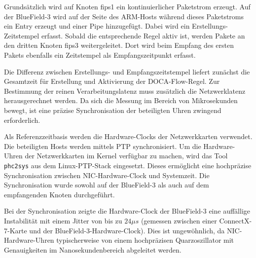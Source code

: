\documentclass[paper=a4, fontsize=11pt]{scrartcl} %
\numberwithin{equation}{section} %
\numberwithin{figure}{section} %
\numberwithin{table}{section} %
\begin{document}
Grundsätzlich wird auf Knoten fips1 ein kontinuierlicher Paketstrom erzeugt. Auf der BlueField-3 wird auf der Seite des ARM-Hosts während dieses Paketstroms ein Entry erzeugt und einer Pipe hinzugefügt. Dabei wird ein Erstellungs-Zeitstempel erfasst. Sobald die entsprechende Regel aktiv ist, werden Pakete an den dritten Knoten fips3 weitergeleitet. Dort wird beim Empfang des ersten Pakets ebenfalls ein Zeitstempel als Empfangszeitpunkt erfasst.

Die Differenz zwischen Erstellungs- und Empfangszeitstempel liefert zunächst die Gesamtzeit für Erstellung und Aktivierung der DOCA-Flow-Regel. Zur Bestimmung der reinen Verarbeitungslatenz muss zusätzlich die Netzwerklatenz herausgerechnet werden. Da sich die Messung im Bereich von Mikrosekunden bewegt, ist eine präzise Synchronisation der beteiligten Uhren zwingend erforderlich.

Als Referenzzeitbasis werden die Hardware-Clocks der Netzwerkkarten verwendet. Die beteiligten Hosts werden mittels PTP synchronisiert. Um die Hardware-Uhren der Netzwerkkarten im Kernel verfügbar zu machen, wird das Tool \texttt{phc2sys} aus dem Linux-PTP-Stack eingesetzt. Dieses ermöglicht eine hochpräzise Synchronisation zwischen NIC-Hardware-Clock und Systemzeit. Die Synchronisation wurde sowohl auf der BlueField-3 als auch auf dem empfangenden Knoten durchgeführt.

Bei der Synchronisation zeigte die Hardware-Clock der BlueField-3 eine auffällige Instabilität mit einem Jitter von bis zu $24\mu s$ (gemessen zwischen einer ConnectX-7-Karte und der BlueField-3-Hardware-Clock). Dies ist ungewöhnlich, da NIC-Hardware-Uhren typischerweise von einem hochpräzisen Quarzoszillator mit Genauigkeiten im Nanosekundenbereich abgeleitet werden.
\end{document}
